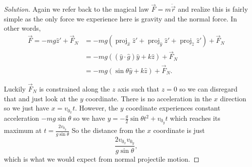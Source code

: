 \documentclass{article}
\theoremstyle{norm}
\DeclareMathOperator{\proj}{proj}
\begin{document}
\begin{proof}[Solution]
Again we refer back to the magical law $\vec{F} = m \ddot{\vec{r}}$ and
realize this is fairly simple as the only force we experience here is
gravity and the normal force. In other words,
\[ \begin{aligned}
\vec{F} = -mg \hat{z}' + \vec{F}_N &= -mg(\proj_{\hat{x}} \hat{z}' +
\proj_{\hat{y}} \hat{z}' + \proj_{\hat{z}} \hat{z}') + \vec{F}_N \\
&= -mg\left( (\hat{y} \cdot \hat{g}) \hat{y} + k \hat{z} \right) +
\vec{F}_N \\
&= -mg \left( \sin \theta \hat{y} + k \hat{z} \right) + \vec{F}_N.
\end{aligned} \]

Luckily $\vec{F}_N$ is constrained along the $z$ axis such that $z = 0$
so we can disregard that and just look at the $y$ coordinate. There is
no acceleration in the $x$ direction so we just have $x = v_{0_x} t$.
However, the $y$ coordinate experiences constant acceleration $-mg \sin
\theta$ so we have $y = - \frac{g}{2} \sin \theta t^2 + v_{0_y} t$ which
reaches its maximum at $t = \frac{2 v_{0_y}}{g \sin \theta}$ So the
distance from the $x$ coordinate is just
\[ \boxed{\frac{2 v_{0_x} v_{0_y}}{g \sin \theta}}, \]
which is what we would expect from normal projectile motion.
\end{proof}
\end{document}
